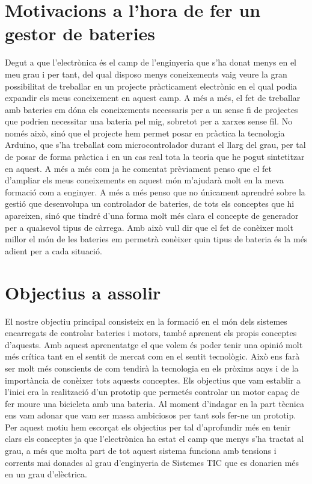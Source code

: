 \section{Motivacions a l'hora de fer un gestor de bateries}
Degut a que l'electrònica és el camp de l'enginyeria que s'ha donat menys en el meu grau i per tant, del qual disposo menys coneixements vaig veure la gran possibilitat de treballar en un projecte pràcticament electrònic en el qual podia expandir els meus coneixement en aquest camp. A més a més, el fet de treballar amb bateries em dóna els coneixements necessaris per a un sense fi de projectes que podrien necessitar una bateria pel mig, sobretot per a xarxes sense fil. No només això, sinó que el projecte hem permet posar en pràctica la tecnologia Arduino, que s'ha treballat com microcontrolador durant el llarg del grau, per tal de posar de forma pràctica i en un cas real tota la teoria que he pogut sintetitzar en aquest. 
\smallskip \newline
A més a més com ja he comentat prèviament penso que el fet d'ampliar els meus coneixements en aquest món m'ajudarà molt en la meva formació com a enginyer. A més a més penso que no únicament aprendré sobre la gestió que desenvolupa un controlador de bateries, de tots els conceptes que hi apareixen, sinó que tindré d'una forma molt més clara el concepte de generador per a qualsevol tipus de càrrega. Amb això vull dir que el fet de conèixer molt millor el món de les bateries em permetrà conèixer quin tipus de bateria és la més adient per a cada situació.

\section{Objectius a assolir}
El nostre objectiu principal consisteix en la formació en el món dels sistemes encarregats de controlar bateries i motors, també aprenent els propis conceptes d'aquests. Amb aquest aprenentatge el que volem és poder tenir una opinió molt més crítica tant en el sentit de mercat com en el sentit tecnològic. Això ens farà ser molt més conscients de com tendirà la tecnologia en els pròxims anys i de la importància de conèixer tots aquests conceptes.
Els objectius que vam establir a l'inici era la realització d'un prototip que permetés controlar un motor capaç de fer moure una bicicleta amb una bateria. Al moment d'indagar en la part tècnica ens vam adonar que vam ser massa ambiciosos per tant sols fer-ne un prototip. Per aquest motiu hem escorçat els objectius per tal d'aprofundir més en tenir clars els conceptes ja que l'electrònica ha estat el camp que menys s'ha tractat al grau, a més que molta part de tot aquest sistema funciona amb tensions i corrents mai donades al grau d'enginyeria de Sistemes TIC que es donarien més en un grau d'elèctrica. 


